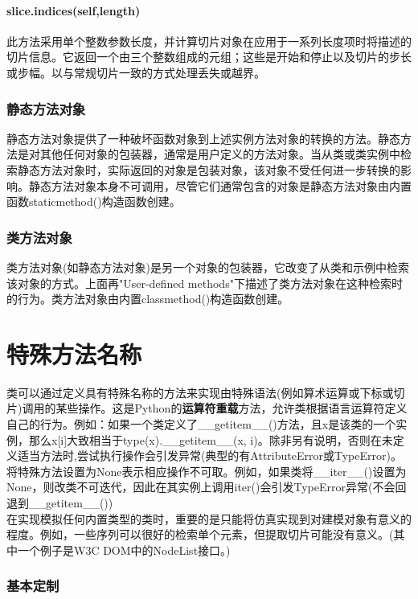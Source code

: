 \documentclass[10pt,UTF8]{ctexart}
\begin{document}
\begin{flushleft}
\paragraph{slice.indices(self,length)}
此方法采用单个整数参数长度，并计算切片对象在应用于一系列长度项时将描述的切片信息。它返回一个由三个整数组成的元组；这些是开始和停止以及切片的步长或步幅。以与常规切片一致的方式处理丢失或越界。
\subsubsection{静态方法对象}
静态方法对象提供了一种破坏函数对象到上述实例方法对象的转换的方法。静态方法是对其他任何对象的包装器，通常是用户定义的方法对象。当从类或类实例中检索静态方法对象时，实际返回的对象是包装对象，该对象不受任何进一步转换的影响。静态方法对象本身不可调用，尽管它们通常包含的对象是静态方法对象由内置函数staticmethod()构造函数创建。
\subsubsection{类方法对象}
类方法对象(如静态方法对象)是另一个对象的包装器，它改变了从类和示例中检索该对象的方式。上面再"User-defined methods"下描述了类方法对象在这种检索时的行为。类方法对象由内置classmethod()构造函数创建。
\section{特殊方法名称}
类可以通过定义具有特殊名称的方法来实现由特殊语法(例如算术运算或下标或切片)调用的某些操作。这是Python的\textbf{运算符重载}方法，允许类根据语言运算符定义自己的行为。例如：如果一个类定义了__getitem__()方法，且x是该类的一个实例，那么x[i]大致相当于type(x).__getitem__(x, i)。除非另有说明，否则在未定义适当方法时,尝试执行操作会引发异常(典型的有AttributeError或TypeError)。\\
\indent 将特殊方法设置为None表示相应操作不可取。例如，如果类将__iter__()设置为None，则改类不可迭代，因此在其实例上调用iter()会引发TypeError异常(不会回退到__getitem__())\\
\indent 在实现模拟任何内置类型的类时，重要的是只能将仿真实现到对建模对象有意义的程度。例如，一些序列可以很好的检索单个元素，但提取切片可能没有意义。(其中一个例子是W3C DOM中的NodeList接口。)
\subsubsection{基本定制}

\end{flushleft}
\end{document}
